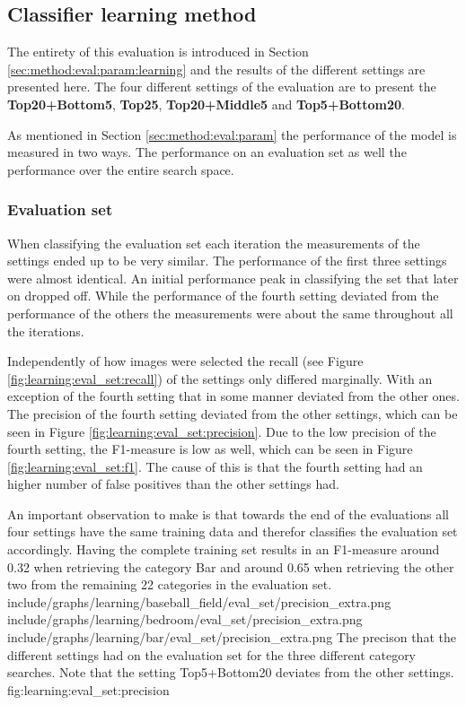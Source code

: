 
\subsection{Classifier learning method}
\label{sec:res:learning}

The entirety of this evaluation is introduced in Section \ref{sec:method:eval:param:learning} and the results of the different settings are presented here. 
The four different settings of the evaluation are to present the \textbf{Top20+Bottom5}, \textbf{Top25}, \textbf{Top20+Middle5} and \textbf{Top5+Bottom20}.

As mentioned in Section \ref{sec:method:eval:param} the performance of the model is measured in two ways. The performance on an evaluation set as well the performance over the entire search space.

\subsubsection{Evaluation set}
\label{sec:res:learning:eval}
When classifying the evaluation set each iteration the measurements of the settings ended up to be very similar. The performance of the first three settings were almost identical. An initial performance peak in classifying the set that later on dropped off. While the performance of the fourth setting deviated from the performance of the others the measurements were about the same throughout all the iterations.

Independently of how images were selected the recall (see Figure \ref{fig:learning:eval_set:recall}) of the settings only differed marginally. With an exception of the fourth setting that in some manner deviated from the other ones. 
The precision of the fourth setting deviated from the other settings, which can be seen in Figure \ref{fig:learning:eval_set:precision}. Due to the low precision of the fourth setting, the F1-measure is low as well, which can be seen in Figure \ref{fig:learning:eval_set:f1}. The cause of this is that the fourth setting had an higher number of false positives than the other settings had.

An important observation to make is that towards the end of the evaluations all four settings have the same training data and therefor classifies the evaluation set accordingly. Having the complete training set results in an F1-measure around 0.32 when retrieving the category Bar and around 0.65 when retrieving the other two from the remaining 22 categories in the evaluation set.
\tripfigurenear
{include/graphs/learning/baseball_field/eval_set/precision_extra.png}
{include/graphs/learning/bedroom/eval_set/precision_extra.png}
{include/graphs/learning/bar/eval_set/precision_extra.png}
{The precison that the different settings had on the evaluation set for the three different category searches. Note that the setting Top5+Bottom20 deviates from the other settings.}
{fig:learning:eval_set:precision}

